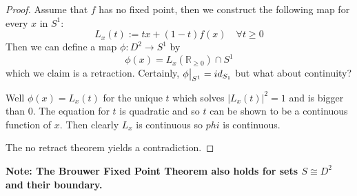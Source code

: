 \documentclass[11pt]{article}
\newcommand{\defeq}{:=}
\newcommand{\abs}[1]{|#1|}
\newcommand\restr[2]{{%
  \left.\kern-\nulldelimiterspace %
  #1 %
  \vphantom{\big|} %
  \right|_{#2} %
  }}
\newcommand{\R}{\mathbb{R}}
\newenvironment{note}
	{\begin{mdframed}[backgroundcolor=white, linecolor=red, roundcorner=5pt, linewidth=1pt]\bfseries{Note:}\normalfont}
	{\end{mdframed}}
\begin{document}
\begin{proof}
Assume that $f$ has no fixed point, then we construct the following map for every $x$ in $S^1$:
\[
	L_x(t)\defeq tx+(1-t)f(x)\quad \forall t\geq 0
\]
Then we can define a map $\phi:D^2\to S^1$ by
\[
	\phi(x)=L_x(\R_{\geq 0})\cap S^1
\]
which we claim is a retraction.
Certainly, $\restr{\phi}{S^1}=id_{S_1}$ but what about continuity?

Well $\phi(x)=L_x(t)$ for the unique $t$ which solves $\abs{L_x(t)}^2=1$ and is bigger than 0.
The equation for $t$ is quadratic and so $t$ can be shown to be a continuous function of $x$.
Then clearly $L_x$ is continuous so $phi$ is continuous.

The no retract theorem yields a contradiction.
\end{proof}
\begin{note}
The Brouwer Fixed Point Theorem also holds for sets $S\cong D^2$ and their boundary.
\end{note}
\end{document}
